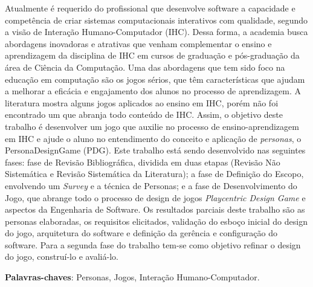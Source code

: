 \begin{resumo}

Atualmente é requerido do profissional que desenvolve software a capacidade e competência de criar sistemas computacionais interativos com qualidade, segundo a visão de Interação Humano-Computador (IHC). Dessa forma, a academia busca abordagens inovadoras e atrativas que venham complementar o ensino e aprendizagem da disciplina de IHC em cursos de graduação e pós-graduação da área de Ciência da Computação. Uma das abordagens que tem sido foco na educação em computação são os jogos sérios, que têm características que ajudam a melhorar a eficácia e engajamento dos alunos no processo de aprendizagem. A literatura mostra alguns jogos aplicados ao ensino em IHC, porém não foi encontrado um que abranja todo conteúdo de IHC. Assim, o objetivo deste trabalho é desenvolver um jogo que auxilie no processo de ensino-aprendizagem em IHC e ajude o aluno no entendimento do conceito e aplicação de \textit{personas}, o PersonaDesignGame (PDG). Este trabalho está sendo desenvolvido nas seguintes fases: fase de Revisão Bibliográfica, dividida em duas etapas (Revisão Não Sistemática e Revisão Sistemática da Literatura); a fase de Definição do Escopo, envolvendo um \textit{Survey} e a técnica de Personas; e a fase de Desenvolvimento do Jogo, que abrange todo o processo de design de jogos \textit{Playcentric Design Game} e aspectos da Engenharia de Software. {\color{textmodified}Os resultados parciais deste trabalho são as personas elaboradas, os requisitos elicitados, validação do esboço inicial do design do jogo, arquitetura do software e definição da gerência e configuração do software. Para a segunda fase do trabalho tem-se como objetivo refinar o design do jogo, construí-lo e avaliá-lo.}



 \vspace{\onelineskip}
    
 \noindent
 \textbf{Palavras-chaves}: Personas, Jogos, Interação Humano-Computador.
\end{resumo}
